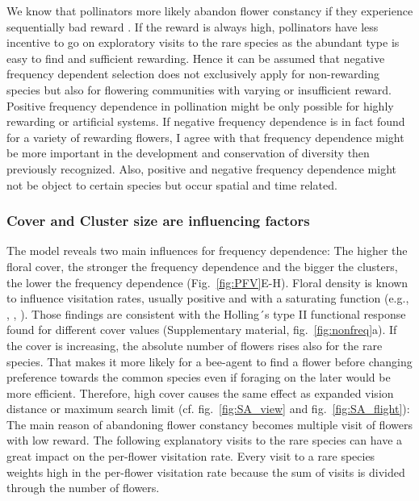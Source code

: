 We know that pollinators more likely abandon flower constancy if they experience sequentially bad reward \citep{chittka1997foraging,goulson1994model}. If the reward is always high, pollinators have less incentive to go on exploratory visits to the rare species as the abundant type is easy to find and sufficient rewarding. Hence it can be assumed that negative frequency dependent selection does not exclusively apply for non-rewarding species but also for flowering communities with varying or insufficient reward. Positive frequency dependence in pollination might be only possible for highly rewarding or artificial systems. If negative frequency dependence is in fact found for a variety of rewarding flowers, I agree with \cite{Eckhart2006frequency} that frequency dependence might be more important in the development and conservation of diversity then previously recognized. Also, positive and negative frequency dependence might not be object to certain species but occur spatial and time related. 



\subsubsection*{Cover and Cluster size are influencing factors}

The model reveals two main influences for frequency dependence: The higher the floral cover, the stronger the frequency dependence and the bigger the clusters, the lower the frequency dependence (Fig.~\ref{fig:PFV}E-H). 
Floral density is known to influence visitation rates, usually positive and with a saturating function (e.g.\citealt{rathcke1983competition}, \citealt{essenberg2012explaining}, \citealt{bernhardt2008effects}, \citealt{Kunin1997}). Those findings are consistent with the Holling´s type II functional response found for different cover values (Supplementary material, fig.~\ref{fig:nonfreq}a). If the cover is increasing, the absolute number of flowers rises also for the rare species. That makes it more likely for a bee-agent to find a flower before changing preference towards the common species even if foraging on the later would be more efficient. Therefore, high cover causes the same effect as expanded vision distance or maximum search limit (cf. fig.~\ref{fig:SA_view} and fig.~\ref{fig:SA_flight}): The main reason of abandoning flower constancy becomes multiple visit of flowers with low reward. The following explanatory visits to the rare species can have a great impact on the per-flower visitation rate. Every visit to a rare species weights high in the per-flower visitation rate because the sum of visits is divided through the number of flowers. 

